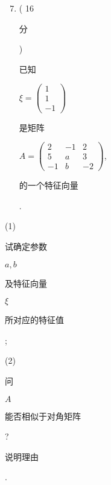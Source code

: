 \documentclass[10pt]{article}
\begin{document}
\begin{enumerate}
  \setcounter{enumi}{6}
  \item ( 16 \begin{CJK}{UTF8}{mj}分\end{CJK}) \begin{CJK}{UTF8}{mj}已知\end{CJK} $\xi=\left(\begin{array}{c}1 \\ 1 \\ -1\end{array}\right)$ \begin{CJK}{UTF8}{mj}是矩阵\end{CJK} $A=\left(\begin{array}{ccc}2 & -1 & 2 \\ 5 & a & 3 \\ -1 & b & -2\end{array}\right)$, \begin{CJK}{UTF8}{mj}的一个特征向量\end{CJK}.
\end{enumerate}
(1) \begin{CJK}{UTF8}{mj}试确定参数\end{CJK} $a, b$ \begin{CJK}{UTF8}{mj}及特征向量\end{CJK} $\xi$ \begin{CJK}{UTF8}{mj}所对应的特征值\end{CJK};

(2) \begin{CJK}{UTF8}{mj}问\end{CJK} $A$ \begin{CJK}{UTF8}{mj}能否相似于对角矩阵\end{CJK}? \begin{CJK}{UTF8}{mj}说明理由\end{CJK}.
\end{document}

